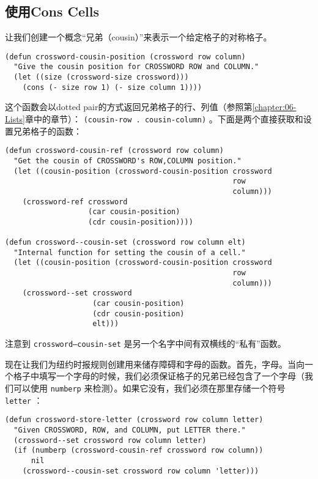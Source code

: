 \subsection{使用Cons Cells}
\label{section:10-Using-Cons-Cells}

让我们创建一个概念“兄弟（cousin）”来表示一个给定格子的对称格子。

\begin{verbatim}
(defun crossword-cousin-position (crossword row column)
  "Give the cousin position for CROSSWORD ROW and COLUMN."
  (let ((size (crossword-size crossword)))
    (cons (- size row 1) (- size column 1))))
\end{verbatim}

这个函数会以dotted pair的方式返回兄弟格子的行、列值（参照第\ref{chapter:06-Lists}章中的章节）： \texttt{(cousin-row . cousin-column)} 。下面是两个直接获取和设置兄弟格子的函数：

\begin{verbatim}
(defun crossword-cousin-ref (crossword row column)
  "Get the cousin of CROSSWORD's ROW,COLUMN position."
  (let ((cousin-position (crossword-cousin-position crossword
                                                    row
                                                    column)))
    (crossword-ref crossword
                   (car cousin-position)
                   (cdr cousin-position))))

(defun crossword--cousin-set (crossword row column elt)
  "Internal function for setting the cousin of a cell."
  (let ((cousin-position (crossword-cousin-position crossword
                                                    row
                                                    column)))
    (crossword--set crossword
                    (car cousin-position)
                    (cdr cousin-position)
                    elt)))
\end{verbatim}

注意到 \texttt{crossword--cousin-set} 是另一个名字中间有双横线的“私有”函数。

现在让我们为纽约时报规则创建用来储存障碍和字母的函数。首先，字母。当向一个格子中填写一个字母的时候，我们必须保证格子的兄弟已经包含了一个字母（我们可以使用 \texttt{numberp} 来检测）。如果它没有，我们必须在那里存储一个符号 \texttt{letter} ：

\begin{verbatim}
(defun crossword-store-letter (crossword row column letter)
  "Given CROSSWORD, ROW, and COLUMN, put LETTER there."
  (crossword--set crossword row column letter)
  (if (numberp (crossword-cousin-ref crossword row column))
      nil
    (crossword--cousin-set crossword row column 'letter)))
\end{verbatim}

